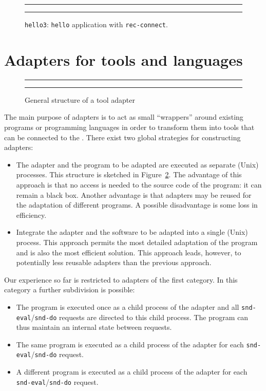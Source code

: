 \documentclass[twoside]{article} %
\begin{document}
\begin{figure}[tb]
\rule{\textwidth}{0.5mm}

  \caption{{\tt hello3}: {\tt hello} application with {\tt rec-connect}.}
  \label{fig:hello3.tb}
\rule{\textwidth}{0.5mm}
\end{figure}


\section{\label{Adapters}Adapters for tools and languages}
\begin{figure}[tb]
\rule{\textwidth}{0.5mm}
  
  \centerline{\box\graph}
  \caption{General structure of a tool adapter}
  \label{fig:adapter}
\rule{\textwidth}{0.5mm}
\end{figure}

The main purpose of adapters is to act as small ``wrappers'' around existing
programs or programming languages in order to transform them into tools that
can be connected to the \TB. There exist two global strategies for
constructing adapters:

\begin{itemize}
\item The adapter and the program to be adapted are executed as separate
(Unix) processes. This structure is sketched in Figure~\ref{fig:adapter}.
The advantage of this approach is that no access is
needed to the source code of the program: it can remain a black box.
Another advantage is that adapters may be reused for the adaptation of
different programs. A possible disadvantage is some loss in
efficiency.

\item Integrate the adapter and the software to be adapted into a single
(Unix) process. This approach permits the most detailed adaptation of
the program and is also the most efficient solution. This approach
leads, however, to potentially less reusable adapters than the
previous approach.

\end{itemize}

Our experience so far is restricted to adapters of the first category.
In this category a further subdivision is possible:
\begin{itemize}
\item The program is executed once as a child process of the adapter
and all {\tt snd-eval}/{\tt snd-do} requests are directed to this child process.
The program can thus maintain an internal state between requests.

\item The same program is executed as a child process of the adapter
for each {\tt snd-eval}/{\tt snd-do} request.

\item A different program is executed as a child process of the adapter
for each {\tt snd-eval}/{\tt snd-do} request.

\end{itemize}
\end{document}
